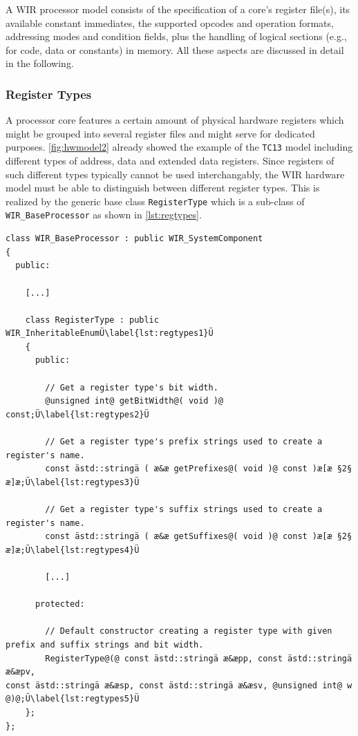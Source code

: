A \gls{WIR} processor model consists of the specification of a core's register file(s), its available constant immediates, the supported opcodes and operation formats, addressing modes and condition fields, plus the handling of logical sections (e.g., for code, data or constants) in memory.
All these aspects are discussed in detail in the following.


\subsubsection{Register Types}
\label{sssec:regtypes}

A processor core features a certain amount of physical hardware registers which might be grouped into several register files and might serve for dedicated purposes.
\cref{fig:hwmodel2} already showed the example of the \texttt{TC13} model including different types of address, data and extended data registers.
Since registers of such different types typically cannot be used interchangably, the \gls{WIR} hardware model must be able to distinguish between different register types.
This is realized by the generic base class \texttt{RegisterType} which is a sub-class of \texttt{WIR\_BaseProcessor} as shown in \cref{lst:regtypes}.

\begin{lstlisting}[style=code,float=h,caption={Generic Register Type Handling of Class \texttt{WIR\_BaseProcessor}},label=lst:regtypes]
class WIR_BaseProcessor : public WIR_SystemComponent
{
  public:

    [...]

    class RegisterType : public WIR_InheritableEnumÜ\label{lst:regtypes1}Ü
    {
      public:

        // Get a register type's bit width.
        @unsigned int@ getBitWidth@( void )@ const;Ü\label{lst:regtypes2}Ü

        // Get a register type's prefix strings used to create a register's name.
        const ästd::stringä ( æ&æ getPrefixes@( void )@ const )æ[æ §2§ æ]æ;Ü\label{lst:regtypes3}Ü

        // Get a register type's suffix strings used to create a register's name.
        const ästd::stringä ( æ&æ getSuffixes@( void )@ const )æ[æ §2§ æ]æ;Ü\label{lst:regtypes4}Ü

        [...]

      protected:

        // Default constructor creating a register type with given prefix and suffix strings and bit width.
        RegisterType@(@ const ästd::stringä æ&æpp, const ästd::stringä æ&æpv,                                                             const ästd::stringä æ&æsp, const ästd::stringä æ&æsv, @unsigned int@ w @)@;Ü\label{lst:regtypes5}Ü
    };
};
\end{lstlisting}

